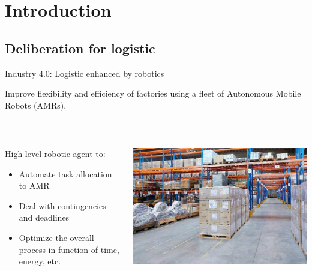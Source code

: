 \section{Introduction}
\subsection{Deliberation for logistic}


\begin{frame}{Industry 4.0: Logistic enhanced by robotics}
    \centering

    Improve flexibility and efficiency of factories using a fleet of Autonomous Mobile Robots (AMRs).

    ~~

\begin{columns}
    \begin{column}{0.6\textwidth}
        \pause
        High-level robotic agent to:
        \begin{itemize}
            \pause
            \item Automate task allocation to AMR
            \pause
            \item Deal with contingencies and deadlines
            \pause
            \item Optimize the overall process in function of time, energy, etc.
        \end{itemize}
    \end{column}
    \begin{column}{0.4\textwidth}
        \includegraphics[width = \textwidth]{images/logisticsolutions.jpg}
    \end{column}
\end{columns}
\end{frame}

